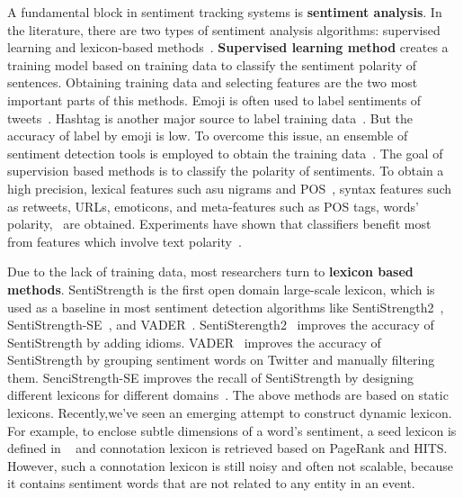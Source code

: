 \documentclass[runningheads]{llncs}
\begin{document}
A fundamental block in sentiment tracking systems is \textbf{sentiment analysis}. In the literature, there are two types of sentiment analysis algorithms: supervised learning and lexicon-based methods~\cite{Ahmed2017SentiCR}. \textbf{Supervised learning method} creates a training model based on training data
to classify the sentiment polarity of sentences. Obtaining training data and selecting features are the two most important parts of this methods. 
Emoji is often used to label sentiments of tweets~\cite{Go2009Supervisedlearning,Pak2010Supervisedlearning}. Hashtag is another major source to label training data~\cite{Papadopoulos2012SocialEvent}.
But the accuracy of label by emoji is low. To overcome this issue, an ensemble of sentiment detection tools is employed to obtain the training data~\cite{Barbosa2010Supervisedlearning}. 
The goal of supervision based methods is to classify the polarity of sentiments. To obtain a high precision, lexical features such asu nigrams and POS~\cite{Go2009Supervisedlearning,Davidov2010Supervisedlearning}, syntax features  such as  retweets, URLs, emoticons, and meta-features such as  POS tags, words’ polarity,~\cite{Barbosa2010Supervisedlearning} are obtained.
Experiments have shown that classifiers benefit most from features which involve text polarity~\cite{Agarwal2010Supervisedlearning}.

Due to the lack of training data, most researchers turn to \textbf{lexicon based methods}. 
SentiStrength is the first open domain large-scale lexicon, which is used as a baseline in most sentiment detection algorithms like SentiStrength2~\cite{Thelwall2012lexicon}, SentiStrength-SE~\cite{Rakibul2017SentiStrength-SE}, and VADER~\cite{Hutto2014SSimproved}. 
SentiSterength2~\cite{Thelwall2012lexicon} improves the accuracy of SentiStrength by adding idioms. 
VADER~\cite{Hutto2014SSimproved} improves the accuracy of SentiStrength by grouping sentiment words on Twitter and manually filtering them. 
SenciStrength-SE improves the recall of SentiStrength by designing different lexicons for different domains~\cite{Rakibul2017SentiStrength-SE}. 
The above methods are based on static lexicons.
Recently,we've seen an emerging attempt to construct dynamic lexicon. 
For example, to enclose subtle dimensions of a word’s sentiment, a seed lexicon is defined in ~\cite{Feng2011lexicon} and connotation lexicon is retrieved based on PageRank and HITS. 
However, such a connotation lexicon is still noisy and often not scalable, because it contains sentiment words that are not related to any entity in an event.
\end{document}
